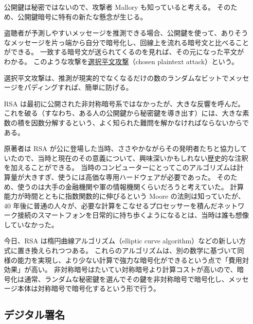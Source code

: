 \documentclass[uplatex]{jsarticle}
\def\label#1{}%
\newcounter{thm}[section]
\begin{document}
公開鍵は秘密ではないので、攻撃者 Mallory も知っていると考える。
そのため、公開鍵暗号に特有の新たな懸念が生じる。

\begin{dfn}[選択平文攻撃]\label{dfn:ch5-chosen-plaintext}
盗聴者が予測しやすいメッセージを推測できる場合、公開鍵を使って、ありそうなメッセージを片っ端から自分で暗号化し、回線上を流れる暗号文と比べることができる。
一致する暗号文が送られてくるのを見れば、その元になった平文がわかる。
このような攻撃を\underline{選択平文攻撃}（chosen plaintext attack）という。
\end{dfn}

選択平文攻撃は、推測が現実的でなくなるだけの数のランダムなビットでメッセージをパディングすれば、簡単に防げる。

RSA は最初に公開された非対称暗号系ではなかったが、大きな反響を呼んだ。
これを破る（すなわち、ある人の公開鍵から秘密鍵を導き出す）には、大きな素数の積を因数分解するという、よく知られた難問を解かなければならないからである。

\begin{rem}\label{rem:ch5-rsa-history}
原著者は RSA が公に登場した当時、ささやかながらその発明者たちと協力していたので、当時と現在のその意義について、興味深いかもしれない歴史的な注釈を加えることができる。
当時のコンピューターにとってこのアルゴリズムは計算量が大きすぎ、使うには高価な専用ハードウェアが必要であった。
そのため、使うのは大手の金融機関や軍の情報機関くらいだろうと考えていた。
計算能力が時間とともに指数関数的に伸びるという Moore の法則は知っていたが、40 年後に普通の人々が、必要な計算をこなせるプロセッサーを積んだネットワーク接続のスマートフォンを日常的に持ち歩くようになるとは、当時は誰も想像していなかった。
\end{rem}

今日、RSA は楕円曲線アルゴリズム（elliptic curve algorithm）などの新しい方式に置き換えられつつある。
これらのアルゴリズムは、別の数学に基づいて同様の能力を実現し、より少ない計算で強力な暗号化ができるという点で「費用対効果」が高い。
非対称暗号はたいてい対称暗号より計算コストが高いので、暗号化は通常、ランダムな秘密鍵を選んでその鍵を非対称暗号で暗号化し、メッセージ本体は対称暗号で暗号化するという形で行う。

\subsection{デジタル署名}
\end{document}
